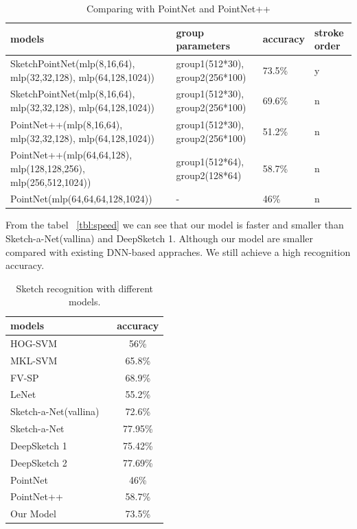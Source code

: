\begin{table}
\centering
\begin{tabular}{llll}
    \hline
     models&group parameters& accuracy& stroke order\\
    \hline
     SketchPointNet(mlp(8,16,64), mlp(32,32,128), mlp(64,128,1024))&group1(512*30), group2(256*100)& 73.5\% & y\\
    \hline
     SketchPointNet(mlp(8,16,64), mlp(32,32,128), mlp(64,128,1024))&group1(512*30), group2(256*100)& 69.6\% & n\\
    \hline
     PointNet++(mlp(8,16,64), mlp(32,32,128), mlp(64,128,1024))&group1(512*30), group2(256*100)& 51.2\% &n\\
    \hline
     PointNet++(mlp(64,64,128), mlp(128,128,256), mlp(256,512,1024))&group1(512*64), group2(128*64)& 58.7\% &n\\
    \hline
     PointNet(mlp(64,64,64,128,1024))&-& 46\% &n\\
    \hline
\end{tabular}
\caption{Comparing with PointNet and PointNet++}
\label{tbl:pointnet_cp}
\end{table}

From the tabel ~\ref{tbl:speed} we can see that our model is faster and smaller than Sketch-a-Net(vallina) and DeepSketch 1. Although our model are smaller compared with existing DNN-based appraches. We still achieve a high recognition accuracy.

\begin{table}[htbp]
\centering
\begin{tabular}{lc}
    \hline
     models &accuracy\\
    \hline
     HOG-SVM ~\cite{Eitz2012HowDH}& 56\% \\
     MKL-SVM ~\cite{LiHSG15} & 65.8\% \\
     FV-SP ~\cite{Schneider2014SketchCA} & 68.9\% \\
     LeNet ~\cite{LeCun1998GradientbasedLA}& 55.2\% \\
     Sketch-a-Net(vallina) ~\cite{Yu2015SketchaNetTB}& 72.6\% \\
     Sketch-a-Net ~\cite{Yu2015SketchaNetTB}& 77.95\% \\
     DeepSketch 1 ~\cite{Seddati2015DeepSketchDC}& 75.42\% \\
     DeepSketch 2 ~\cite{Dupont2016DeepSketch2D}& 77.69\% \\
     PointNet ~\cite{qi2017pointnet}& 46\% \\
     PointNet++ ~\cite{qi2017pointnetplusplus}& 58.7\% \\
     Our Model& 73.5\% \\
    \hline
\end{tabular}
\caption{Sketch recognition with different models.}
\label{tbl:acc}
\end{table}

